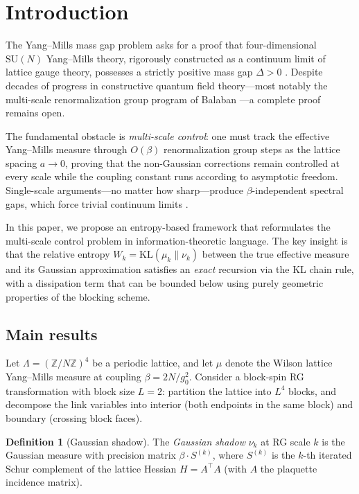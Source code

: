 \documentclass[11pt]{article}
\theoremstyle{definition}
\newtheorem{definition}[theorem]{Definition}
\newcommand{\KL}{\mathrm{KL}}
\newcommand{\Z}{\mathbb{Z}}
\begin{document}
\tableofcontents

\section{Introduction}\label{sec:intro}

The Yang--Mills mass gap problem asks for a proof that four-dimensional 
$\mathrm{SU}(N)$ Yang--Mills theory, rigorously constructed as a 
continuum limit of lattice gauge theory, possesses a strictly positive 
mass gap $\Delta > 0$ \cite{JW}.  Despite decades of progress in 
constructive quantum field theory---most notably the multi-scale 
renormalization group program of Balaban \cite{Balaban1,Balaban2,Balaban3}---a complete proof remains open.

The fundamental obstacle is \emph{multi-scale control}: one must track 
the effective Yang--Mills measure through $O(\beta)$ renormalization 
group steps as the lattice spacing $a \to 0$, proving that the 
non-Gaussian corrections remain controlled at every scale while the 
coupling constant runs according to asymptotic freedom.  Single-scale 
arguments---no matter how sharp---produce $\beta$-independent spectral 
gaps, which force trivial continuum limits \cite{DS1}.

In this paper, we propose an entropy-based framework that reformulates 
the multi-scale control problem in information-theoretic language.  
The key insight is that the relative entropy 
$W_k = \KL(\mu_k \| \nu_k)$ between the true effective measure and 
its Gaussian approximation satisfies an \emph{exact} recursion via the 
KL chain rule, with a dissipation term that can be bounded below using 
purely geometric properties of the blocking scheme.

\subsection{Main results}

Let $\Lambda = (\Z/N\Z)^4$ be a periodic lattice, and let $\mu$ denote 
the Wilson lattice Yang--Mills measure at coupling $\beta = 2N/g_0^2$.  
Consider a block-spin RG transformation with block size $L = 2$: 
partition the lattice into $L^4$ blocks, and decompose the link variables 
into interior (both endpoints in the same block) and boundary (crossing 
block faces).

\begin{definition}[Gaussian shadow]
The \emph{Gaussian shadow} $\nu_k$ at RG scale $k$ is the Gaussian 
measure with precision matrix $\beta \cdot S^{(k)}$, where $S^{(k)}$ 
is the $k$-th iterated Schur complement of the lattice Hessian 
$H = A^\top A$ (with $A$ the plaquette incidence matrix).
\end{definition}
\end{document}
